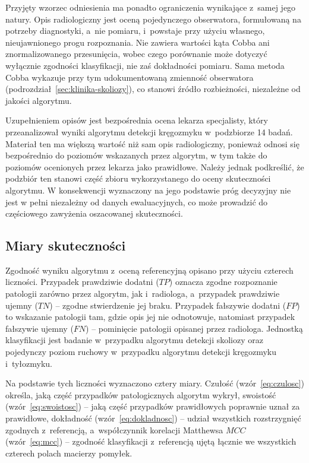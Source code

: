 Przyjęty wzorzec odniesienia ma ponadto ograniczenia wynikające z~samej jego natury.
Opis radiologiczny jest oceną pojedynczego obserwatora, formułowaną na potrzeby diagnostyki, a~nie pomiaru, i~powstaje przy użyciu własnego, nieujawnionego progu rozpoznania.
Nie zawiera wartości kąta Cobba ani znormalizowanego przesunięcia, wobec czego porównanie może dotyczyć wyłącznie zgodności klasyfikacji, nie zaś dokładności pomiaru.
Sama metoda Cobba wykazuje przy tym udokumentowaną zmienność obserwatora (podrozdział~\ref{sec:klinika-skoliozy}), co stanowi źródło rozbieżności, niezależne od jakości algorytmu.

Uzupełnieniem opisów jest bezpośrednia ocena lekarza specjalisty, który przeanalizował wyniki algorytmu detekcji kręgozmyku w~podzbiorze 14 badań.
Materiał ten ma większą wartość niż sam opis radiologiczny, ponieważ odnosi się bezpośrednio do poziomów wskazanych przez algorytm, w tym także do poziomów ocenionych przez lekarza jako prawidłowe. Należy jednak podkreślić, że podzbiór ten stanowi część zbioru wykorzystanego do oceny skuteczności algorytmu. W konsekwencji wyznaczony na jego podstawie próg decyzyjny nie jest w pełni niezależny od danych ewaluacyjnych, co może prowadzić do częściowego zawyżenia oszacowanej skuteczności.

\subsection{Miary skuteczności}
\label{subsec:miary}

Zgodność wyniku algorytmu z~oceną referencyjną opisano przy użyciu czterech liczności.
Przypadek prawdziwie dodatni ($TP$) oznacza zgodne rozpoznanie patologii zarówno przez algorytm, jak i~radiologa, a~przypadek prawdziwie ujemny ($TN$) -- zgodne stwierdzenie jej braku.
Przypadek fałszywie dodatni ($FP$) to wskazanie patologii tam, gdzie opis jej nie odnotowuje, natomiast przypadek fałszywie ujemny ($FN$) -- pominięcie patologii opisanej przez radiologa.
Jednostką klasyfikacji jest badanie w~przypadku algorytmu detekcji skoliozy oraz pojedynczy poziom ruchowy w~przypadku algorytmu detekcji kręgozmyku i~tyłozmyku.

Na podstawie tych liczności wyznaczono cztery miary.
Czułość (wzór~\ref{eq:czulosc}) określa, jaką część przypadków patologicznych algorytm wykrył, swoistość (wzór~\ref{eq:swoistosc}) -- jaką część przypadków prawidłowych poprawnie uznał za prawidłowe, dokładność (wzór~\ref{eq:dokladnosc}) -- udział wszystkich rozstrzygnięć zgodnych z~referencją, a~współczynnik korelacji Matthewsa $MCC$ (wzór~\ref{eq:mcc}) -- zgodność klasyfikacji z~referencją ujętą łącznie we wszystkich czterech polach macierzy pomyłek.

